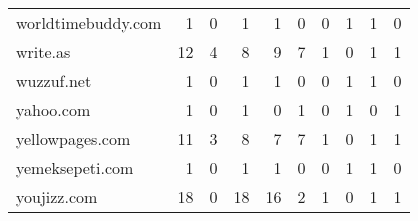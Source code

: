 \begin{tabular}{lrrrrrrrrr}
         worldtimebuddy.com &                                1 &                                  0 &                                      1 &                            1 &                           0 &                                   0 &                                      1 &                             1 &                            0 \\
                   write.as &                               12 &                                  4 &                                      8 &                            9 &                           7 &                                   1 &                                      0 &                             1 &                            1 \\
                 wuzzuf.net &                                1 &                                  0 &                                      1 &                            1 &                           0 &                                   0 &                                      1 &                             1 &                            0 \\
                  yahoo.com &                                1 &                                  0 &                                      1 &                            0 &                           1 &                                   0 &                                      1 &                             0 &                            1 \\
            yellowpages.com &                               11 &                                  3 &                                      8 &                            7 &                           7 &                                   1 &                                      0 &                             1 &                            1 \\
            yemeksepeti.com &                                1 &                                  0 &                                      1 &                            1 &                           0 &                                   0 &                                      1 &                             1 &                            0 \\
                youjizz.com &                               18 &                                  0 &                                     18 &                           16 &                           2 &                                   1 &                                      0 &                             1 &                            1 \\

\end{tabular}
